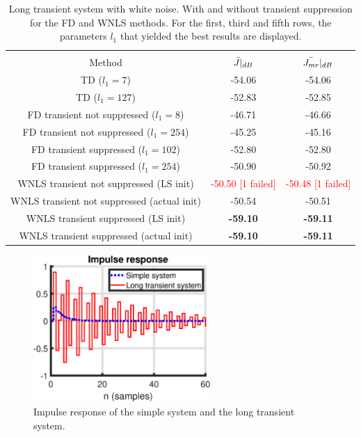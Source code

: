 \begin{table}[H]
\centering
\begin{tabular}{|ccc|}
\hline
&&\\[-2.5ex]
Method & $\Bar{J}|_{dB}$ & $\Bar{J_{mr}}|_{dB}$ \\
\hline
TD ($l_1 = 7$) & -54.06 & -54.06 \\
TD ($l_1 = 127$) &  -52.83 & -52.85 \\
FD transient not suppressed ($l_1 = 8$) & -46.71 & -46.66 \\
FD transient not suppressed ($l_1 = 254$) & -45.25 & -45.16 \\
FD transient suppressed ($l_1 = 102$) & -52.80 & -52.80 \\
FD transient suppressed ($l_1 = 254$) & -50.90 & -50.92 \\
WNLS transient not suppressed (LS init) & \textcolor{red}{-50.50 [1 failed]} & \textcolor{red}{-50.48 [1 failed]} \\
WNLS transient not suppressed (actual init) & -50.54 & -50.51 \\
WNLS transient suppressed (LS init) & \textbf{-59.10} & \textbf{-59.11} \\
WNLS transient suppressed (actual init) & \textbf{-59.10} & \textbf{-59.11} \\
\hline
\end{tabular}
\caption{Long transient system with white noise. With and without transient suppression for the FD and WNLS methods. For the first, third and fifth rows, the parameters $l_1$ that yielded the best results are displayed.}
\label{tab:long_transient_white_transient_with_without_TD_vs_FD_vs_WNLS}
\end{table}

\begin{figure}[H]
\centering
\includegraphics[width = 0.6\textwidth]{figures/impulse_response_simple_long}
\caption{Impulse response of the simple system and the long transient system.}
\label{fig:impulse_simple_long}
\end{figure}

